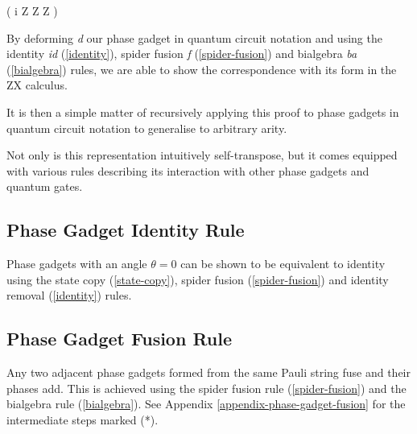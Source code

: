 { \left( i  Z \otimes Z \otimes Z \right)}


By deforming \textit{d} our phase gadget in quantum circuit notation and using the identity \textit{id} (\ref{identity}), spider fusion \textit{f} (\ref{spider-fusion}) and bialgebra \textit{ba} (\ref{bialgebra}) rules, we are able to show the correspondence with its form in the ZX calculus.


It is then a simple matter of recursively applying this proof to phase gadgets in quantum circuit notation to generalise to arbitrary arity.

%
\label{phase-gadget-proof}

Not only is this representation intuitively self-transpose, but it comes equipped with various rules describing its interaction with other phase gadgets and quantum gates.


\subsection{Phase Gadget Identity Rule}%
\label{phase-gadget-identity}

Phase gadgets with an angle $\theta = 0$ can be shown to be equivalent to identity using the state copy (\ref{state-copy}), spider fusion (\ref{spider-fusion}) and identity removal (\ref{identity}) rules.



\subsection{Phase Gadget Fusion Rule}%
\label{phase-gadget-fusion}

Any two adjacent phase gadgets formed from the same Pauli string fuse and their phases add. This is achieved using the spider fusion rule (\ref{spider-fusion}) and the bialgebra rule (\ref{bialgebra}). See Appendix  \ref{appendix-phase-gadget-fusion} for the intermediate steps marked (*).

